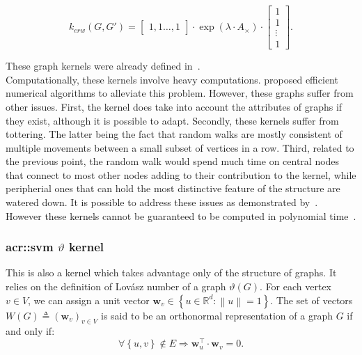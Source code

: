 \begin{itemize}
\begin{equation}
                                    \label{eq::geometric_random_kernel}
                                    k_{erw}(G, G') = \begin{bmatrix}
                                        1, 1\dots,1
                                    \end{bmatrix}\cdot \exp\left(\lambda\cdot A_{\times}\right)\cdot\begin{bmatrix}
                                        1\\
                                        1\\
                                        \vdots\\
                                        1
                                    \end{bmatrix}.
                                \end{equation}
                    \end{itemize}
                    These graph kernels were already defined in~\parencite{gartner2003graph}.\\

                Computationally, these kernels involve heavy computations.
                \textcite{vishwanathan2010graph} proposed efficient numerical algorithms to alleviate this problem.
                However, these graphs suffer from other issues.
                First, the kernel does take into account the attributes of graphs if they exist, although it is possible to adapt.
                Secondly, these kernels suffer from tottering.
                The latter being the fact that random walks are mostly consistent of multiple movements between a small subset of vertices in a row.
                Third, related to the previous point, the random walk would spend much time on central nodes that connect to most other nodes adding to their contribution to the kernel, while peripherial ones that can hold the most distinctive feature of the structure are watered down.
                It is possible to address these issues as demonstrated by~\textcite{horvath2004cyclic, mahe2004extensions}.
                However these kernels cannot be guaranteed to be computed in polynomial time~\parencite{vishwanathan2010graph}.

            \subsubsection{\gls*{acr::svm} $\vartheta$ kernel}
                This is also a kernel which takes advantage only of the structure of graphs.
                It relies on the definition of Lov\'asz number of a graph $\vartheta(G)$.
                For each vertex $v \in V$, we can assign a unit vector \(\bm{w}_v \in \left\{u \in \mathbb{R}^d: \left\lVert u \right\rVert = 1 \right\}\).
                The set of vectors \(W(G) \triangleq \left(\bm{w}_v\right)_{v \in V}\) is said to be an orthonormal representation of a graph $G$ if and only if:
                \begin{equation*}
                    \forall \left\{u,v\right\} \notin E \Rightarrow \bm{w}_u^\intercal\cdot \bm{w}_v=0.
                \end{equation*}

